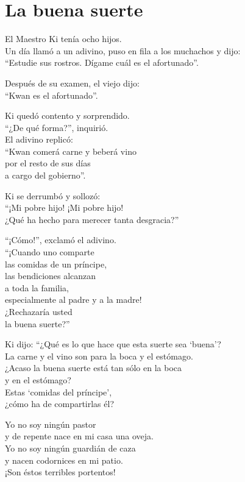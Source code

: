 \documentclass[book,b5paper,hidelinks,final]{memoir}
\begin{document}
	\chapter*{La buena suerte}
	
	El Maestro Ki tenía ocho hijos.\\
	Un día llamó a un adivino, puso en fila a los muchachos y dijo:\\
	``Estudie sus rostros. Dígame cuál es el afortunado''.
	
	Después de su examen, el viejo dijo:\\
	``Kwan es el afortunado''.
	
	Ki quedó contento y sorprendido.\\
	``¿De qué forma?'', inquirió.\\
	El adivino replicó:\\
	``Kwan comerá carne y beberá vino\\
	por el resto de sus días\\
	a cargo del gobierno''.
	
	Ki se derrumbó y sollozó:\\
	``¡Mi pobre hijo! ¡Mi pobre hijo!\\
	¿Qué ha hecho para merecer tanta desgracia?''
	
	``¡Cómo!'', exclamó el adivino.\\
	``¡Cuando uno comparte\\
	las comidas de un príncipe,\\
	las bendiciones alcanzan\\
	a toda la familia,\\
	especialmente al padre y a la madre!\\
	¿Rechazaría usted\\
	la buena suerte?''
	
	Ki dijo: ``¿Qué es lo que hace que esta suerte sea `buena'?\\
	La carne y el vino son para la boca y el estómago.\\
	¿Acaso la buena suerte está tan sólo en la boca\\
	y en el estómago?\\
	Estas `comidas del príncipe',\\
	¿cómo ha de compartirlas él?
	
	Yo no soy ningún pastor\\
	y de repente nace en mi casa una oveja.\\
	Yo no soy ningún guardián de caza\\
	y nacen codornices en mi patio.\\
	¡Son éstos terribles portentos!
	
\end{document}
